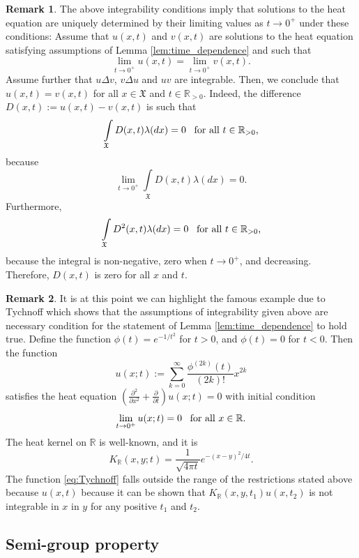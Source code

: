 \documentclass[11pt,reqno]{amsart}
\theoremstyle{remark}
\theoremstyle{definition}
\newtheorem{remark}{Remark}
\numberwithin{theorem}{section} \numberwithin{equation}{section}
\newcommand{\X}{\mathfrak{X}}
\begin{document}
\begin{remark} The above integrability conditions imply that solutions to the heat
equation are uniquely determined by their limiting values as $t\rightarrow 0^{+}$ under
these conditions:  Assume that $u(x,t)$ and $v(x,t)$ are solutions to the heat equation satisfying assumptions of Lemma \ref{lem:time_dependence} and such that
$$
\lim\limits_{t\rightarrow 0^{+}} u(x,t) = \lim\limits_{t\rightarrow 0^{+}} v(x,t).
$$
Assume further that
$u\Delta v$, $v\Delta u$ and $uv$ are integrable.  Then, we conclude
that $u(x,t) = v(x,t)$ for all $x\in \X$ and $t\in \mathbb{R}_{>0}$.  Indeed, the difference
$D(x,t):= u(x,t) - v(x,t)$ is such that
$$
\int\limits_{\X} D(x,t)\lambda(dx) = 0
\,\,\,\,\,
\text{\rm for all $t \in \mathbb{R}_{>0}$,}
$$
because
$$
\lim\limits_{t \rightarrow 0^+}\int\limits_{\X} D(x,t)\lambda(dx) = 0.
$$
Furthermore,
$$
\int\limits_{\X} D^{2}(x,t)\lambda(dx)= 0
\,\,\,\,\,
\text{\rm for all $t \in \mathbb{R}_{>0}$,}
$$
because the integral is non-negative, zero when $t\rightarrow 0^{+}$, and decreasing.  Therefore,
$D(x,t)$ is zero for all $x$ and $t$.
\end{remark}

\begin{remark}
It is at this point we can highlight the famous example due to Tychnoff which shows that the assumptions of integrability given above are necessary condition for the statement of Lemma \ref{lem:time_dependence} to hold true.  Define the function
$\phi(t) = e^{-1/t^{2}}$ for $t > 0$, and $\phi(t) = 0$ for $t < 0$.  Then the function
\begin{equation}\label{eq:Tychnoff}
u(x;t):= \sum\limits_{k=0}^{\infty} \frac{\phi^{(2k)}(t)}{(2k)!}x^{2k}
\end{equation}
satisfies the heat equation $\left(\frac{\partial^2}{\partial x^2} + \frac{\partial}{\partial t}\right)u(x;t)=0$ with initial condition
$$
\lim\limits_{t \rightarrow 0^{+}} u(x;t) = 0
\,\,\,\,\,
\text{\rm for all $x \in \mathbb{R}$.}
$$
The heat kernel on $\mathbb{R}$ is well-known, and it is
$$
K_{\mathbb{R}}(x,y;t) = \frac{1}{\sqrt{4\pi t}}e^{-(x-y)^{2}/4t}.
$$
The function \eqref{eq:Tychnoff} falls outside the range of the restrictions stated above because
$u(x,t)$ because it can be shown that $K_{\mathbb{R}}(x,y,t_{1})u(x,t_{2})$ is not integrable in $x$
in $y$ for any positive $t_{1}$ and $t_{2}$.
\end{remark}

\subsection{Semi-group property}
\end{document}
